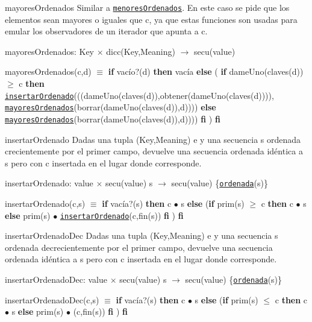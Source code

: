 \begin{DoxyParagraph}{mayores\-Ordenados}
Similar a \href{axiomas.html#menoresOrdenados}{\tt menores\-Ordenados}. En este caso se pide que los elementos sean mayores o iguales que c, ya que estas funciones son usadas para emular los observadores de un iterador que apunta a c.

mayores\-Ordenados\-: Key $\times$ dicc(\-Key,\-Meaning) $\to$ secu(value) \par
 mayores\-Ordenados(c,d) $\equiv$ {\bfseries if} vacío?(d) {\bfseries then} vacía {\bfseries else} ( {\bfseries if} dame\-Uno(claves(d)) $\geq$ c {\bfseries then} \href{axiomas.html#insertarOrdenado}{\tt insertar\-Ordenado}(((dame\-Uno(claves(d)),obtener(dame\-Uno(claves(d)))), \href{axiomas.html#mayoresOrdenados}{\tt mayores\-Ordenados}(borrar(dame\-Uno(claves(d)),d)))) {\bfseries else} \href{axiomas.html#mayoresOrdenados}{\tt mayores\-Ordenados}(borrar(dame\-Uno(claves(d)),d)))) {\bfseries fi} ) {\bfseries fi} 


\end{DoxyParagraph}
\begin{DoxyParagraph}{insertar\-Ordenado}
Dadas una tupla (Key,Meaning) e y una secuencia s ordenada crecientemente por el primer campo, devuelve una secuencia ordenada idéntica a s pero con c insertada en el lugar donde corresponde.

insertar\-Ordenado\-: value $\times$ secu(value) s $\to$ secu(value) \{\href{axiomas.html#ordenada}{\tt ordenada}(s)\} \par
 insertar\-Ordenado(c,s) $\equiv$ {\bfseries if} vacía?(s) {\bfseries then} c $\bullet$ s {\bfseries else} ({\bfseries if} prim(s) $\geq$ c {\bfseries then} c $\bullet$ s {\bfseries else} prim(s) $\bullet$ \href{axiomas.html#insertarOrdenado}{\tt insertar\-Ordenado}(c,fin(s)) {\bfseries fi} ) {\bfseries fi} 


\end{DoxyParagraph}
\begin{DoxyParagraph}{insertar\-Ordenado\-Dec}
Dadas una tupla (Key,Meaning) e y una secuencia s ordenada decrecientemente por el primer campo, devuelve una secuencia ordenada idéntica a s pero con c insertada en el lugar donde corresponde.

insertar\-Ordenado\-Dec\-: value $\times$ secu(value) s $\to$ secu(value) \{\href{axiomas.html#ordenada}{\tt ordenada}(s)\} \par
 insertar\-Ordenado\-Dec(c,s) $\equiv$ {\bfseries if} vacía?(s) {\bfseries then} c $\bullet$ s {\bfseries else} ({\bfseries if} prim(s) $\leq$ c {\bfseries then} c $\bullet$ s {\bfseries else} prim(s) $\bullet$ (c,fin(s)) {\bfseries fi} ) {\bfseries fi} 


\end{DoxyParagraph}
